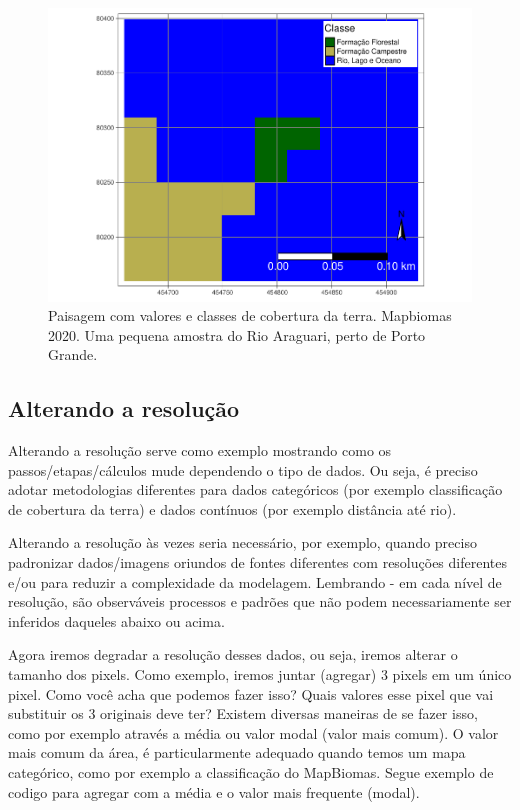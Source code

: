 \documentclass[
]{article}
\begin{document}
\begin{figure}
\centering
\includegraphics{epr_files/figure-latex/mapa-mapbiomas-cores-1.pdf}
\caption{\label{fig:mapa-mapbiomas-cores}Paisagem com valores e classes de cobertura da terra. Mapbiomas 2020. Uma pequena amostra do Rio Araguari, perto de Porto Grande.}
\end{figure}

\newpage

\hypertarget{alterando-a-resoluuxe7uxe3o}{%
\subsection{Alterando a resolução}\label{alterando-a-resoluuxe7uxe3o}}

Alterando a resolução serve como exemplo mostrando como os passos/etapas/cálculos mude dependendo o tipo de dados. Ou seja, é preciso adotar metodologias diferentes para dados categóricos (por exemplo classificação de cobertura da terra) e dados contínuos (por exemplo distância até rio).

Alterando a resolução às vezes seria necessário, por exemplo, quando preciso padronizar dados/imagens oriundos de fontes diferentes com resoluções diferentes e/ou para reduzir a complexidade da modelagem. Lembrando - em cada nível de resolução, são observáveis processos e padrões que não podem necessariamente ser inferidos daqueles abaixo ou acima.

Agora iremos degradar a resolução desses dados, ou seja, iremos alterar o tamanho dos pixels. Como exemplo, iremos juntar (agregar) 3 pixels em um único pixel. Como você acha que podemos fazer isso? Quais valores esse pixel que vai substituir os 3 originais deve ter? Existem diversas maneiras de se fazer isso, como por exemplo através a média ou valor modal (valor mais comum). O valor mais comum da área, é particularmente adequado quando temos um mapa categórico, como por exemplo a classificação do MapBiomas. Segue exemplo de codigo para agregar com a média e o valor mais frequente (modal).
\end{document}
